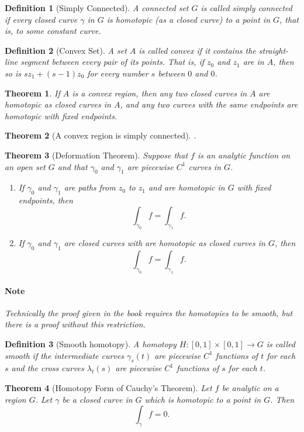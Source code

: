\documentclass[a4paper]{article}
\newtheorem{definition}{Definition}
\newtheorem{theorem}{Theorem}
\begin{document}
\begin{definition}[Simply Connected]
  A connected set \(G\) is called simply connected if every closed curve \(\gamma\) in \(G\) is homotopic (as a closed curve) to a point in \(G\), that is, to some constant curve. 
\end{definition}


\begin{definition}[Convex Set]
  A set \(A\) is called convex if it contains the straight-line segment between every pair of its points. 
  That is, if \(z_0\) and \(z_1\) are in \(A\), then so is \(s z_1 + (s - 1) z_0\) for every number \(s\) between \(0\) and \(0\).
\end{definition}

\begin{theorem}
  If \(A\) is a convex region, then any two closed curves in \(A\) are homotopic as closed curves in \(A\), and any two curves with the same endpoints are homotopic with fixed endpoints. 
\end{theorem}

\begin{theorem}[A convex region is simply connected].
\end{theorem}

\begin{theorem}[Deformation Theorem]
  Suppose that \(f\) is an analytic function on an open set \(G\) and that \(\gamma_0\) and \(\gamma_1\) are piecewise \(C^1\) curves in \(G\). 
  \begin{enumerate}
    \item If \(\gamma_0 \) and \(\gamma_1\) are paths from \(z_0\) to \(z_1\) and are homotopic in \(G\) with fixed endpoints, then 
      \[\int_{\gamma_0} f = \int_{\gamma_1} f.\]
    \item If \(\gamma_0\) and \(\gamma_1\) are closed curves with are homotopic as closed curves in \(G\), then 
      \[\int_{\gamma_0} f = \int_{\gamma_1} f.\]
  \end{enumerate}

  \paragraph{Note}
  Technically the proof given in the book requires the homotopies to be smooth, but there is a proof without this restriction. 
\end{theorem}

\begin{definition}[Smooth homotopy]
  A homotopy \(H : [0, 1] \times [0, 1] \to G\) is called smooth if the intermediate curves \(\gamma_s(t)\) are piecewise \(C^1\) functions of \(t\) for each \(s\) and the cross curves \(\lambda_t(s)\) are piecewise \(C^1\) functions of \(s\) for each \(t\). 
\end{definition}

\begin{theorem}[Homotopy Form of Cauchy's Theorem]
  Let \(f\) be analytic on a region \(G\). 
  Let \(\gamma\) be a closed curve in \(G\) which is homotopic to a point in \(G\). Then
  \[\int_\gamma f = 0.\]
  
\end{theorem}
\end{document}
